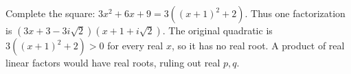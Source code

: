Complete the square: $ 3x^2+6x+9=3((x+1)^2+2)$. Thus one factorization is $\boxed{(3x+3-3i\sqrt2)(x+1+i\sqrt2)}$. The original quadratic is $ 3((x+1)^2+2)>0 $ for every real $ x $, so it has no real root. A product of real linear factors would have real roots, ruling out real $ p,q $.
